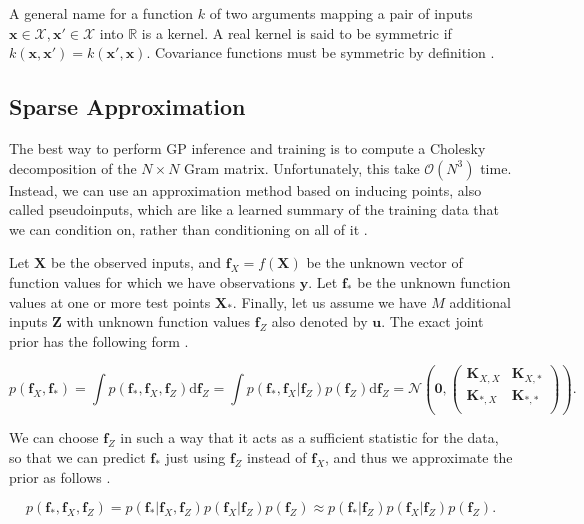 \documentclass[../../../main.tex]{subfiles}
\begin{document}
A general name for a function $k$ of two arguments mapping a pair of inputs $\bm{x}\in\mathcal{X},\bm{x}'\in\mathcal{X}$ into $\mathbb{R}$ is a kernel. A real kernel is said to be symmetric if $k(\bm{x},\bm{x}')=k(\bm{x}',\bm{x})$. Covariance functions must be symmetric by definition \autocite{Rasmussen2005}.

\subsection{Sparse Approximation}

The best way to perform GP inference and training is to compute a Cholesky decomposition of the $N \times N$ Gram matrix. Unfortunately, this take $\mathcal{O}(N^3)$ time. Instead, we can use an approximation method based on inducing points, also called pseudoinputs, which are like a learned summary of the training data that we can condition on, rather than conditioning on all of it \autocite{Murphy2023}.

Let $\bm{X}$ be the observed inputs, and $\bm{f}_X=f(\bm{X})$ be the unknown vector of function values for which we have observations $\bm{y}$. Let $\bm{f}_\ast$ be the unknown function values at one or more test points $\bm{X}_\ast$. Finally, let us assume we have $M$ additional inputs $\bm{Z}$ with unknown function values $\bm{f}_Z$ also denoted by $\bm{u}$. The exact joint prior has the following form \autocite{Murphy2023}.

\begin{equation}
p(\bm{f}_X,\bm{f}_\ast)
= \int p(\bm{f}_\ast,\bm{f}_X,\bm{f}_Z)\mathrm{d}\bm{f}_Z
= \int p(\bm{f}_\ast,\bm{f}_X|\bm{f}_Z)p(\bm{f}_Z)\mathrm{d}\bm{f}_Z
= \mathcal{N}\left(\bm{0},
\begin{pmatrix}
\bm{K}_{X,X} & \bm{K}_{X,\ast} \\
\bm{K}_{\ast,X} & \bm{K}_{\ast,\ast} \\
\end{pmatrix}
\right).
\end{equation}

We can choose $\bm{f}_Z$ in such a way that it acts as a sufficient statistic for the data, so that we can predict $\bm{f}_\ast$ just using $\bm{f}_Z$ instead of $\bm{f}_X$, and thus we approximate the prior as follows \autocite{Murphy2023}.

\begin{equation}
p(\bm{f}_\ast,\bm{f}_X,\bm{f}_Z)
= p(\bm{f}_\ast|\bm{f}_X,\bm{f}_Z)p(\bm{f}_X|\bm{f}_Z)p(\bm{f}_Z)
\approx p(\bm{f}_\ast|\bm{f}_Z)p(\bm{f}_X|\bm{f}_Z)p(\bm{f}_Z).
\end{equation}
\end{document}

